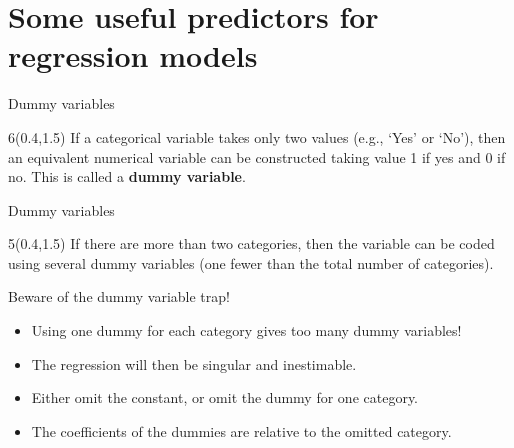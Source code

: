 \documentclass[
  14pt,
  ignorenonframetext,
  aspectratio=169,
]{beamer}
\begin{document}
\section{Some useful predictors for regression
models}\label{some-useful-predictors-for-regression-models}

\begin{frame}{Dummy variables}
\protect{}\label{dummy-variables}
\begin{textblock}{6}(0.4,1.5)
If a categorical variable takes only two values (e.g., `Yes'
or `No'), then an equivalent numerical variable can be constructed taking value 1 if yes and 0 if no. This is called a \textbf{dummy variable}.
\end{textblock}

\end{frame}

\begin{frame}{Dummy variables}
\protect{}\label{dummy-variables-1}
\begin{textblock}{5}(0.4,1.5)
If there are more than two categories, then the variable can
be coded using several dummy variables (one fewer than the total number of categories).

\end{textblock}

\end{frame}

\begin{frame}{Beware of the dummy variable trap!}
\protect{}\label{beware-of-the-dummy-variable-trap}
\begin{itemize}
\item
  Using one dummy for each category gives too many dummy variables!
\item
  The regression will then be singular and inestimable.
\item
  Either omit the constant, or omit the dummy for one category.
\item
  The coefficients of the dummies are relative to the omitted category.
\end{itemize}
\end{frame}
\end{document}
